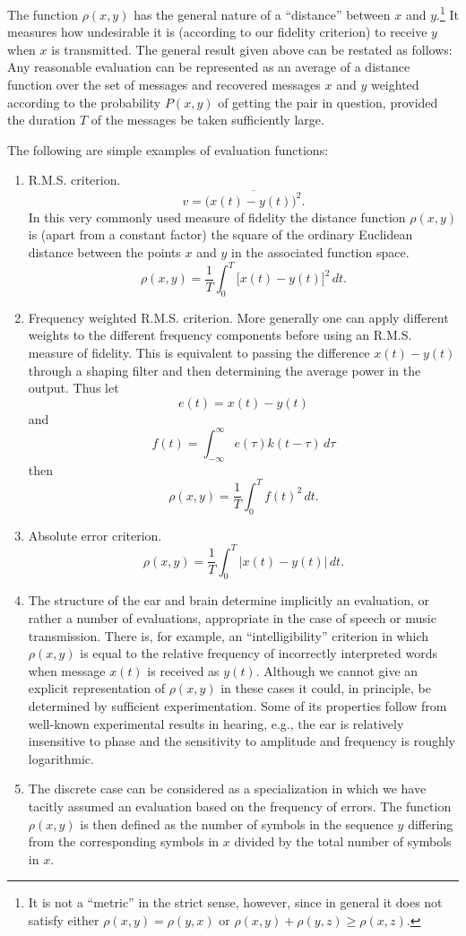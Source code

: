 The function $\rho(x,y)$ has the general nature of a ``distance'' between
$x$ and $y$.\footnote{It is not a ``metric'' in the strict sense, however,
since in general it does not satisfy either $\rho(x,y)=\rho(y,x)$ or
$\rho(x,y)+\rho(y,z)\geq\rho(x,z)$.}  It measures how undesirable it is
(according to our fidelity criterion) to receive $y$ when $x$ is transmitted.
The general result given above can be restated as follows:  Any reasonable
evaluation can be represented as an average of a distance
function over the set of messages and recovered messages $x$ and $y$
weighted according to the probability $P(x,y)$ of getting the pair in
question, provided the duration $T$ of the messages be taken sufficiently
large.

The following are simple examples of evaluation functions:
\begin{enumerate}
\item R.M.S. criterion.
$$
v=\overline{\bigl(x(t)-y(t)\bigr)^2}.
$$
In this very commonly used measure of fidelity the distance function
$\rho(x,y)$ is (apart from a constant factor) the square of the ordinary
Euclidean distance between the points $x$ and $y$
in the associated function space.
$$
\rho(x,y)=\frac1T\int_0^T\bigl[x(t)-y(t)\bigr]^2\,dt.
$$
\item Frequency weighted R.M.S. criterion.  More generally one can apply
different weights to the different frequency components before using an
R.M.S.  measure of fidelity.  This is equivalent to passing the difference
$x(t)-y(t)$ through a shaping filter and then determining the average power
in the output.  Thus let
$$
e(t)=x(t)-y(t)
$$
and
$$
f(t)=\int_{-\infty}^\infty e(\tau)k(t-\tau)\,d\tau
$$
then
$$
\rho(x,y)=\frac1T\int_0^Tf(t)^2\,dt.
$$
\item Absolute error criterion.
$$
\rho(x,y)=\frac1T\int_0^T\bigl|x(t)-y(t)\bigr|\,dt.
$$
\item The structure of the ear and brain determine implicitly
an evaluation, or rather a number of evaluations,
appropriate in the case of speech or music transmission.  There is, for
example, an ``intelligibility'' criterion in which $\rho(x,y)$ is equal to
the relative frequency of incorrectly interpreted words when message $x(t)$
is received as $y(t)$.  Although we cannot give an explicit representation of
$\rho(x,y)$ in these cases it could, in principle, be determined by
sufficient experimentation.  Some of its properties follow from well-known
experimental results in hearing, e.g., the ear is relatively insensitive to
phase and the sensitivity to amplitude and frequency is roughly
logarithmic.
\item The discrete case can be considered as a specialization in which we have
tacitly assumed an evaluation based on the frequency of errors.  The
function $\rho(x,y)$ is then defined as the number of symbols in the
sequence $y$ differing from the corresponding symbols in $x$ divided by the
total number of symbols in $x$.
\end{enumerate}

